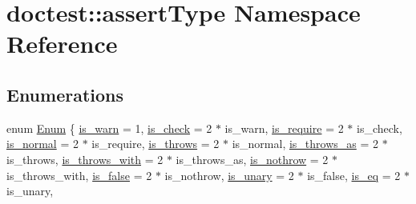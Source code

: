 \hypertarget{namespacedoctest_1_1assert_type}{}\section{doctest\+:\+:assert\+Type Namespace Reference}
\label{namespacedoctest_1_1assert_type}
\subsection*{Enumerations}
\begin{DoxyCompactItemize}
\item 
enum \hyperlink{namespacedoctest_1_1assert_type_ae1bb5bed722f34f1c38b83cb19d326d3}{Enum} \{ \newline
\hyperlink{namespacedoctest_1_1assert_type_ae1bb5bed722f34f1c38b83cb19d326d3a2dd798b430ccf956bc48c3b48bb4e570}{is\+\_\+warn} = 1, 
\hyperlink{namespacedoctest_1_1assert_type_ae1bb5bed722f34f1c38b83cb19d326d3a9ca6ff629647f2a90d4c01ce68800590}{is\+\_\+check} = 2 $\ast$ is\+\_\+warn, 
\hyperlink{namespacedoctest_1_1assert_type_ae1bb5bed722f34f1c38b83cb19d326d3aff8fa549e941fb7ca7adcd49d9ffdf6d}{is\+\_\+require} = 2 $\ast$ is\+\_\+check, 
\hyperlink{namespacedoctest_1_1assert_type_ae1bb5bed722f34f1c38b83cb19d326d3a34258afd98e569142dfb5b0a2c468436}{is\+\_\+normal} = 2 $\ast$ is\+\_\+require, 
\newline
\hyperlink{namespacedoctest_1_1assert_type_ae1bb5bed722f34f1c38b83cb19d326d3a922a5fb427724cad963fb3dd789a8114}{is\+\_\+throws} = 2 $\ast$ is\+\_\+normal, 
\hyperlink{namespacedoctest_1_1assert_type_ae1bb5bed722f34f1c38b83cb19d326d3a278ed7bf7e411c11e25ad8a60933ef34}{is\+\_\+throws\+\_\+as} = 2 $\ast$ is\+\_\+throws, 
\hyperlink{namespacedoctest_1_1assert_type_ae1bb5bed722f34f1c38b83cb19d326d3ab79f3f076e62c260e77febd914bb82c3}{is\+\_\+throws\+\_\+with} = 2 $\ast$ is\+\_\+throws\+\_\+as, 
\hyperlink{namespacedoctest_1_1assert_type_ae1bb5bed722f34f1c38b83cb19d326d3a0ad6f07c0273891b1c3f2fd84fe666dc}{is\+\_\+nothrow} = 2 $\ast$ is\+\_\+throws\+\_\+with, 
\newline
\hyperlink{namespacedoctest_1_1assert_type_ae1bb5bed722f34f1c38b83cb19d326d3a6539bad84e35008dc4a4a2c2d0793318}{is\+\_\+false} = 2 $\ast$ is\+\_\+nothrow, 
\hyperlink{namespacedoctest_1_1assert_type_ae1bb5bed722f34f1c38b83cb19d326d3adfaee7d6a907d7681e53e0e91734e058}{is\+\_\+unary} = 2 $\ast$ is\+\_\+false, 
\hyperlink{namespacedoctest_1_1assert_type_ae1bb5bed722f34f1c38b83cb19d326d3a7010ae6142f085a3bfd85caa251c7499}{is\+\_\+eq} = 2 $\ast$ is\+\_\+unary, 

\end{DoxyCompactItemize}
